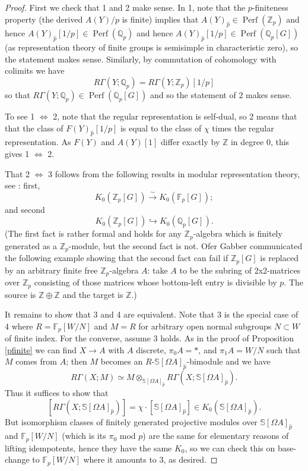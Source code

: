 \documentclass[12pt]{article}
\theoremstyle{definition}
\newcommand{\on}{\operatorname}
\newcommand{\mbb}{\mathbb}
\newcommand{\wh}{\widehat}
\begin{document}
\begin{proof}
First we check that 1 and 2 make sense.  In 1, note that the $p$-finiteness property (the derived $A(Y)/p$ is finite) implies that $A(Y)_{\wh{p}}\in \on{Perf}(\mbb{Z}_p)$ and hence $A(Y)_{\wh{p}}[1/p]\in \on{Perf}(\mbb{Q}_p)$ and hence $A(Y)_{\wh{p}}[1/p]\in \on{Perf}(\mbb{Q}_p[G])$ (as representation theory of finite groups is semisimple in characteristic zero), so the statement makes sense.  Similarly, by commutation of cohomology with colimits we have
$$R\Gamma(Y;\mbb{Q}_p) = R\Gamma(Y;\mbb{Z}_p)[1/p]$$
so that $R\Gamma(Y;\mbb{Q}_p)\in\on{Perf}(\mbb{Q}_p[G
])$ and so the statement of 2 makes sense.

To see 1 $\Leftrightarrow$ 2, note that the regular representation is self-dual, so 2 means that that the class of $F(Y)_{\wh{p}}[1/p]$ is equal to the class of $\chi$ times the regular representation.  As $F(Y)$ and $A(Y)[1]$ differ exactly by $\mbb{Z}$ in degree $0$, this gives 1 $\Leftrightarrow$ 2.

That 2 $\Leftrightarrow$ 3 follows from the following results in modular representation theory, see \cite{serrerepthy}: first,
$$K_0(\mbb{Z}_p[G])\overset{\sim}{\rightarrow} K_0(\mbb{F}_p[G]);$$
and second
$$K_0(\mbb{Z}_p[G])\hookrightarrow K_0(\mbb{Q}_p[G]).$$
(The first fact is rather formal and holds for any $\mbb{Z}_p$-algebra which is finitely generated as a $\mbb{Z}_p$-module, but the second fact is not.  Ofer Gabber communicated the following example showing that the second fact can fail if $\mbb{Z}_p[G]$ is replaced by an arbitrary finite free $\mbb{Z}_p$-algebra $A$: take $A$ to be the subring of 2x2-matrices over $\mbb{Z}_p$ consisting of those matrices whose bottom-left entry is divisible by $p$.  The source is $\mbb{Z}\oplus\mbb{Z}$ and the target is $\mbb{Z}$.)

It remains to show that 3 and 4 are equivalent.  Note that 3 is the special case of 4 where $R=\mbb{F}_p[W/N]$ and $M=R$ for arbitrary open normal subgroups $N\subset W$ of finite index.  For the converse, assume 3 holds.  As in the proof of Proposition \ref{pfinite} we can find $X\to A$ with $A$ discrete, $\pi_0A=\ast$, and $\pi_1A=W/N$ such that $M$ comes from $A$; then $M$ becomes an $R$-$\mbb{S}[\Omega A]_{\wh{p}}$-bimodule and we have
$$R\Gamma(X;M) \simeq M\otimes_{\mbb{S}[\Omega A]_{\wh{p}}}R\Gamma(X;\mbb{S}[\Omega A]_{\wh{p}}).$$
Thus it suffices to show that
$$[R\Gamma(X;\mbb{S}[\Omega A]_{\wh{p}})] = \chi\cdot [\mbb{S}[\Omega A]_{\wh{p}}] \in K_0(\mbb{S}[\Omega A]_{\wh{p}}).$$
But isomorphism classes of finitely generated projective modules over $\mbb{S}[\Omega A]_{\wh{p}}$ and $\mbb{F}_p[W/N]$ (which is its $\pi_0$ mod $p$) are the same for elementary reasons of lifting idempotents, hence they have the same $K_0$, so we can check this on base-change to $\mbb{F}_p[W/N]$ where it amounts to 3, as desired.
\end{proof}
\end{document}

